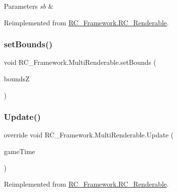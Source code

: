 \begin{DoxyParams}{Parameters}
{\em sb} & \\
\hline
\end{DoxyParams}


Reimplemented from \mbox{\hyperlink{class_r_c___framework_1_1_r_c___renderable_acc26db34e382a25a989c4c0dd0354b23}{R\+C\+\_\+\+Framework.\+R\+C\+\_\+\+Renderable}}.

\mbox{\label{class_r_c___framework_1_1_multi_renderable_a923ab24c09b28daaf29c65d14d23b3ff}} 
\subsubsection{\texorpdfstring{set\+Bounds()}{setBounds()}}
{\footnotesize\ttfamily void R\+C\+\_\+\+Framework.\+Multi\+Renderable.\+set\+Bounds (\begin{DoxyParamCaption}\item[{Rectangle}]{boundsZ }\end{DoxyParamCaption})}

\mbox{\label{class_r_c___framework_1_1_multi_renderable_a3eabd07384410252141e9b10e52b1783}} 
\subsubsection{\texorpdfstring{Update()}{Update()}}
{\footnotesize\ttfamily override void R\+C\+\_\+\+Framework.\+Multi\+Renderable.\+Update (\begin{DoxyParamCaption}\item[{Game\+Time}]{game\+Time }\end{DoxyParamCaption})\hspace{0.3cm}{\ttfamily [virtual]}}



Reimplemented from \mbox{\hyperlink{class_r_c___framework_1_1_r_c___renderable_a5745bedc7ba0587aa1e1d8563c357228}{R\+C\+\_\+\+Framework.\+R\+C\+\_\+\+Renderable}}.



